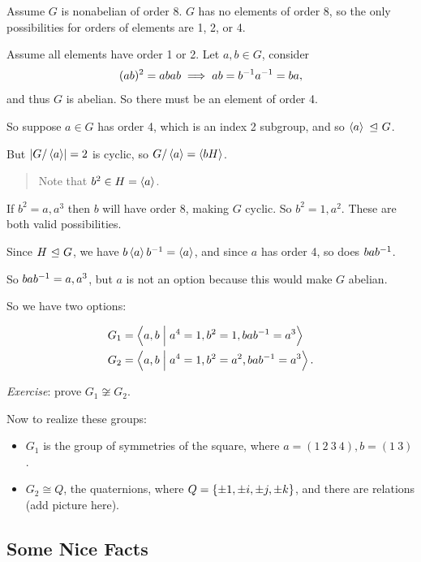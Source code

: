 Assume \(G\) is nonabelian of order 8. \(G\) has no elements of order 8,
so the only possibilities for orders of elements are 1, 2, or 4.

Assume all elements have order 1 or 2. Let \(a,b\in G\), consider \[
(ab)^2 = abab \implies ab=b^{-1} a^{-1} = ba
,\] and thus \(G\) is abelian. So there must be an element of order 4.

So suppose \(a\in G\) has order 4, which is an index 2 subgroup, and so
\(\left\langle{a}\right\rangle {~\trianglelefteq~} G\).

But \({\left\lvert {G/\left\langle{a}\right\rangle} \right\rvert} = 2\) is cyclic, so
\(G/\left\langle{a}\right\rangle = \left\langle{bH}\right\rangle\).

\begin{quote}
Note that \(b^2 \in H = \left\langle{a}\right\rangle\).
\end{quote}

If \(b^2=a, a^3\) then \(b\) will have order 8, making \(G\) cyclic. So
\(b^2 = 1, a^2\). These are both valid possibilities.

Since \(H {~\trianglelefteq~} G\), we have \(b\left\langle{a}\right\rangle b^{-1} = \left\langle{a}\right\rangle\),
and since \(a\) has order 4, so does \(bab^{-1}\).

So \(bab^{-1} = a, a^3\), but \(a\) is not an option because this would
make \(G\) abelian.

So we have two options:

\begin{align*}
G_1 &= \left\langle{a, b \mathrel{\Big|}a^4 = 1, b^2=1, bab^{-1}= a^3}\right\rangle \\
G_2 &= \left\langle{a, b \mathrel{\Big|}a^4 = 1, b^2 = a^2, bab^{-1}= a^3}\right\rangle
.\end{align*}

\emph{Exercise}: prove \(G_1 \not\cong G_2\).

Now to realize these groups:

\begin{itemize}
\item
  \(G_1\) is the group of symmetries of the square, where
  \(a = (1~2~3~4), b=(1~3)\).
\item
  \(G_2 \cong Q\), the quaternions, where
  \(Q = \left\{{\pm 1,\pm i, \pm j, \pm k}\right\}\), and there are relations
  (add picture here).
\end{itemize}

\hypertarget{some-nice-facts}{%
\subsection{Some Nice Facts}\label{some-nice-facts}}

